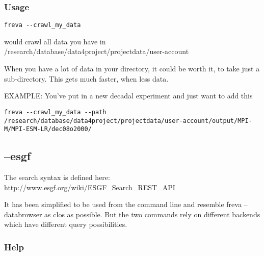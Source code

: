 \documentclass[a4paper,11pt]{ltxdoc}
\begin{document}
\subsubsection*{Usage}
\begin{lstlisting}
freva --crawl_my_data
\end{lstlisting}

would crawl all data you have in
/research/database/data4project/projectdata/user-account

When you have a lot of data in your directory, it could be worth it,
to take just a sub-directory. This gets much faster, when less data.

EXAMPLE: You've put in a new decadal experiment and just want to add this
\begin{lstlisting}
freva --crawl_my_data --path 
/research/database/data4project/projectdata/user-account/output/MPI-M/MPI-ESM-LR/dec08o2000/
\end{lstlisting}

\subsection{--esgf}
The search syntax is defined here: http://www.esgf.org/wiki/ESGF\_Search\_REST\_API

It has been simplified to be used from the command line and resemble freva --databrowser as clos as possible. 
But the two commands rely on different backends which have different query possibilities.

\subsubsection*{Help}
\end{document}

